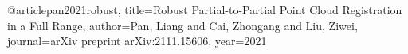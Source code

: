 @article{pan2021robust,
  title={Robust Partial-to-Partial Point Cloud Registration in a Full Range},
  author={Pan, Liang and Cai, Zhongang and Liu, Ziwei},
  journal={arXiv preprint arXiv:2111.15606},
  year={2021}
}
